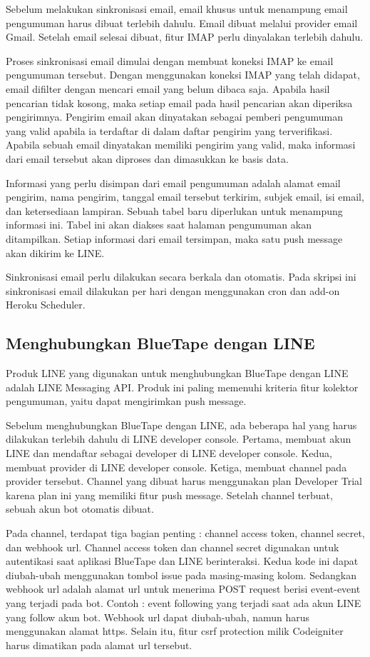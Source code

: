 	Sebelum melakukan sinkronisasi email, email khusus untuk menampung email pengumuman harus dibuat terlebih dahulu. Email dibuat melalui provider email Gmail. Setelah email selesai dibuat, fitur IMAP perlu dinyalakan terlebih dahulu.
	
	Proses sinkronisasi email dimulai dengan membuat koneksi IMAP ke email pengumuman tersebut. Dengan menggunakan koneksi IMAP yang telah didapat, email difilter dengan mencari email yang belum dibaca saja. Apabila hasil pencarian tidak kosong, maka setiap email pada hasil pencarian akan diperiksa pengirimnya. Pengirim email akan dinyatakan sebagai pemberi pengumuman yang valid apabila ia terdaftar di dalam daftar pengirim yang terverifikasi. Apabila sebuah email dinyatakan memiliki pengirim yang valid, maka informasi dari email tersebut akan diproses dan dimasukkan ke basis data.
	
	Informasi yang perlu disimpan dari email pengumuman adalah alamat email pengirim, nama pengirim, tanggal email tersebut terkirim, subjek email, isi email, dan ketersediaan lampiran. Sebuah tabel baru diperlukan untuk menampung informasi ini. Tabel ini akan diakses saat halaman pengumuman akan ditampilkan. Setiap informasi dari email tersimpan, maka satu push message akan dikirim ke LINE.
	
	Sinkronisasi email perlu dilakukan secara berkala dan otomatis. Pada skripsi ini sinkronisasi email dilakukan per hari dengan menggunakan cron dan add-on Heroku Scheduler.
	
\subsection{Menghubungkan BlueTape dengan LINE}
\label{sec:analisisline}
	Produk LINE yang digunakan untuk menghubungkan BlueTape dengan LINE adalah LINE Messaging API. Produk ini paling memenuhi kriteria fitur kolektor pengumuman, yaitu dapat mengirimkan push message.
	
	Sebelum menghubungkan BlueTape dengan LINE, ada beberapa hal yang harus dilakukan terlebih dahulu di LINE developer console. Pertama, membuat akun LINE dan mendaftar sebagai developer di LINE developer console. Kedua, membuat provider di LINE developer console. Ketiga, membuat channel pada provider tersebut. Channel yang dibuat harus menggunakan plan Developer Trial karena plan ini yang memiliki fitur push message. Setelah channel terbuat, sebuah akun bot otomatis dibuat.
	
	Pada channel, terdapat tiga bagian penting : channel access token, channel secret, dan webhook url. Channel access token dan channel secret digunakan untuk autentikasi saat aplikasi BlueTape dan LINE berinteraksi. Kedua kode ini dapat diubah-ubah menggunakan tombol issue pada masing-masing kolom. Sedangkan webhook url adalah alamat url untuk menerima POST request berisi event-event yang terjadi pada bot. Contoh : event following yang terjadi saat ada akun LINE yang follow akun bot. Webhook url dapat diubah-ubah, namun harus menggunakan alamat https. Selain itu, fitur csrf protection milik Codeigniter harus dimatikan pada alamat url tersebut.
	
